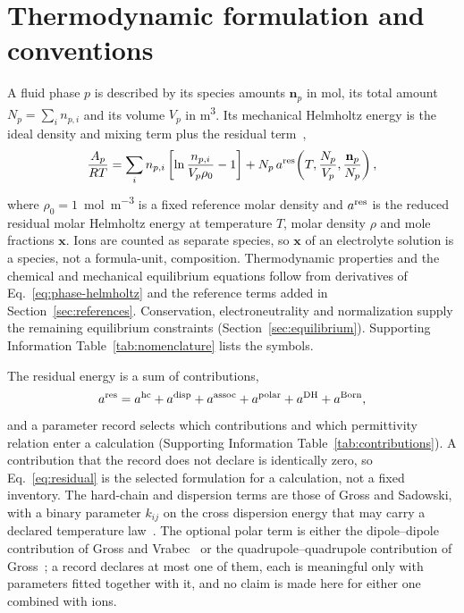\section{Thermodynamic formulation and conventions}
\label{sec:model}
A fluid phase $p$ is described by its species amounts $\mathbf{n}_p$ in mol, its total amount $N_p=\sum_i n_{p,i}$ and its volume $V_p$ in \si{\cubic\metre}.
Its mechanical Helmholtz energy is the ideal density and mixing term plus the residual term~\citep{Gross2001},
\begin{equation}
\frac{A_{p}}{RT}=\sum_i n_{p,i}\left[\ln\frac{n_{p,i}}{V_p\rho_0}-1\right]+N_p\,a^{\mathrm{res}}\!\left(T,\frac{N_p}{V_p},\frac{\mathbf{n}_p}{N_p}\right),
\label{eq:phase-helmholtz}
\end{equation}
where $\rho_0=1$~\si{\mol\per\cubic\metre} is a fixed reference molar density and $a^{\mathrm{res}}$ is the reduced residual molar Helmholtz energy at temperature $T$, molar density $\rho$ and mole fractions $\mathbf{x}$.
Ions are counted as separate species, so $\mathbf{x}$ of an electrolyte solution is a species, not a formula-unit, composition.
Thermodynamic properties and the chemical and mechanical equilibrium equations follow from derivatives of Eq.~\eqref{eq:phase-helmholtz} and the reference terms added in Section~\ref{sec:references}.
Conservation, electroneutrality and normalization supply the remaining equilibrium constraints (Section~\ref{sec:equilibrium}).
Supporting Information Table~\ref{tab:nomenclature} lists the symbols.

The residual energy is a sum of contributions,
\begin{equation}
a^{\mathrm{res}}=a^{\mathrm{hc}}+a^{\mathrm{disp}}+a^{\mathrm{assoc}}+a^{\mathrm{polar}}+a^{\mathrm{DH}}+a^{\mathrm{Born}},
\label{eq:residual}
\end{equation}
and a parameter record selects which contributions and which permittivity relation enter a calculation (Supporting Information Table~\ref{tab:contributions}).
A contribution that the record does not declare is identically zero, so Eq.~\eqref{eq:residual} is the selected formulation for a calculation, not a fixed inventory.
The hard-chain and dispersion terms are those of Gross and Sadowski, with a binary parameter $k_{ij}$ on the cross dispersion energy that may carry a declared temperature law~\citep{Gross2001,Held2014}.
The optional polar term is either the dipole--dipole contribution of Gross and Vrabec~\citep{Gross2006} or the quadrupole--quadrupole contribution of Gross~\citep{grossEquationofstateContributionPolar2005}; a record declares at most one of them, each is meaningful only with parameters fitted together with it, and no claim is made here for either one combined with ions.

